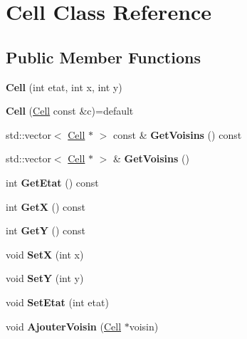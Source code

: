 \hypertarget{class_cell}{}\section{Cell Class Reference}
\label{class_cell}
\subsection*{Public Member Functions}
\begin{DoxyCompactItemize}
\item 
\mbox{\label{class_cell_abfff4b378d15d85506663df528762eaf}} 
{\bfseries Cell} (int etat, int x, int y)
\item 
\mbox{\label{class_cell_aff4c807938a63e9469c1547e7c087e0b}} 
{\bfseries Cell} (\mbox{\hyperlink{class_cell}{Cell}} const \&c)=default
\item 
\mbox{\label{class_cell_a5c2a7b09dcb8afed0040ebdc4267408d}} 
std\+::vector$<$ \mbox{\hyperlink{class_cell}{Cell}} $\ast$ $>$ const  \& {\bfseries Get\+Voisins} () const
\item 
\mbox{\label{class_cell_a92c71a78f5a975bfc28a54267ea2b41f}} 
std\+::vector$<$ \mbox{\hyperlink{class_cell}{Cell}} $\ast$ $>$ \& {\bfseries Get\+Voisins} ()
\item 
\mbox{\label{class_cell_a7640093c787979958fbb772e4fccdffa}} 
int {\bfseries Get\+Etat} () const
\item 
\mbox{\label{class_cell_a3af5ea9b9e031151e16009b22118b07a}} 
int {\bfseries GetX} () const
\item 
\mbox{\label{class_cell_a3668c9664cadb1b94a632d497fa493c5}} 
int {\bfseries GetY} () const
\item 
\mbox{\label{class_cell_a9aaedcce2daccb4aa070f870c1a207ed}} 
void {\bfseries SetX} (int x)
\item 
\mbox{\label{class_cell_a48afb0c8c8d1ebe3409b9a166dcd507d}} 
void {\bfseries SetY} (int y)
\item 
\mbox{\label{class_cell_a33dac87ec7294fdb4c67b8b430ea0946}} 
void {\bfseries Set\+Etat} (int etat)
\item 
\mbox{\label{class_cell_aef5912d85e2ca3e034023fb0874896fa}} 
void {\bfseries Ajouter\+Voisin} (\mbox{\hyperlink{class_cell}{Cell}} $\ast$voisin)
\end{DoxyCompactItemize}
